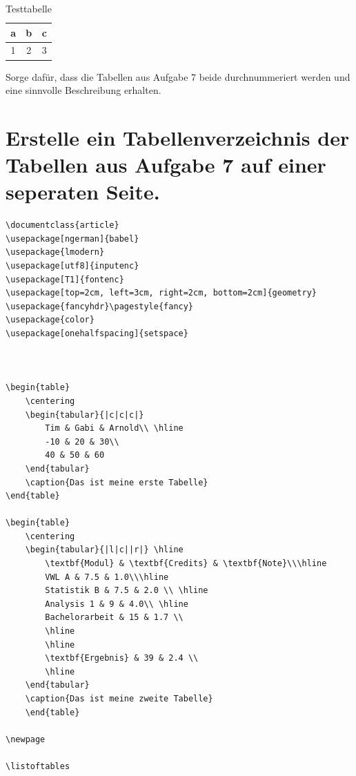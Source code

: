 \vspace{-20pt}
\begin{table}[htpb]
\centering
  \begin{tabular}{|c|c|c|} 
   a & b & c \\ \hline
   1 & 2 & 3 \\
  \end{tabular}
\caption{Testtabelle}
\end{table}

Sorge dafür, dass die Tabellen aus Aufgabe 7 beide durchnummeriert werden und eine sinnvolle Beschreibung erhalten. 
\section{Erstelle ein Tabellenverzeichnis der Tabellen aus Aufgabe 7 auf einer seperaten Seite.\\} 

\begin{Antwort}
\begin{lstlisting}[style=latex]
\documentclass{article}
\usepackage[ngerman]{babel}
\usepackage{lmodern}
\usepackage[utf8]{inputenc}
\usepackage[T1]{fontenc}
\usepackage[top=2cm, left=3cm, right=2cm, bottom=2cm]{geometry}
\usepackage{fancyhdr}\pagestyle{fancy}
\usepackage{color}
\usepackage[onehalfspacing]{setspace}



\begin{table}
	\centering
	\begin{tabular}{|c|c|c|}
		Tim & Gabi & Arnold\\ \hline
		-10 & 20 & 30\\
 		40 & 50 & 60
	\end{tabular}
	\caption{Das ist meine erste Tabelle}
\end{table}

\begin{table}
	\centering
	\begin{tabular}{|l|c||r|} \hline
  		\textbf{Modul} & \textbf{Credits} & \textbf{Note}\\\hline
		VWL A & 7.5 & 1.0\\\hline
  		Statistik B & 7.5 & 2.0 \\ \hline
  		Analysis 1 & 9 & 4.0\\ \hline
  		Bachelorarbeit & 15 & 1.7 \\
  		\hline
  		\hline
  		\textbf{Ergebnis} & 39 & 2.4 \\
  		\hline
 	\end{tabular}
	\caption{Das ist meine zweite Tabelle}
	\end{table}

\newpage

\listoftables


\end{lstlisting}


\end{Antwort}
\newpage

